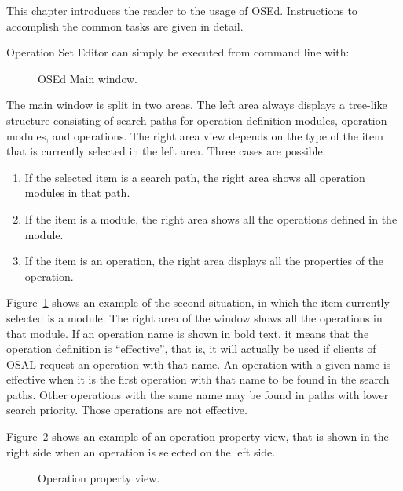 \documentclass[a4paper,twoside]{tceusermanual}
\begin{document}
This chapter introduces the reader to the usage of OSEd. Instructions to
accomplish the common tasks are given in detail.

Operation Set Editor can simply be executed from command line with:


\begin{figure}[tb]
\centerline{}
\caption{OSEd Main window.}
\label{fig:osed_main_window}
\end{figure}

The main window is split in two areas. The left area always displays a
tree-like structure consisting of search paths for operation definition
modules, operation modules, and operations.  The right area view depends on the
type of the item that is currently selected in the left area. Three cases are
possible.
%
\begin{enumerate}
\item %
  If the selected item is a search path, the right area shows all operation
modules in that path.
\item %
  If the item is a module, the right area shows all the operations defined
  in the module.
\item %
  If the item is an operation, the right area displays all the properties of
  the operation.
\end{enumerate}

Figure~\ref{fig:osed_main_window} shows an example of the second situation, in
which the item currently selected is a module. The right area of the window
shows all the operations in that module. If an operation name is shown in
bold text, it means that the operation definition is ``effective'', that is,
it will actually be used if clients of OSAL request an operation with that
name. An operation with a given name is effective when it is the first
operation with that name to be found in the search paths. Other operations
with the same name may be found in paths with lower search priority. Those
operations are not effective.

Figure~\ref{fig:osed_operation_property_view} shows an example of an operation 
property view, that is shown in the right side when an operation is selected 
on the left side.

\begin{figure}[tb]
\centerline{}
\caption{Operation property view.}
\label{fig:osed_operation_property_view}
\end{figure}
\end{document}
